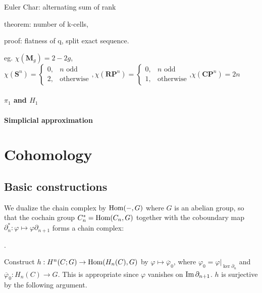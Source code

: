 \documentclass[11pt]{article}
\theoremstyle{definition}
\theoremstyle{plain}
\newcommand{\im}{\textup{Im}\,}
\newcommand{\Hom}{\textup{Hom}}
\newcommand{\1}{\mathbf{1}}
\begin{document}
Euler Char: alternating sum of rank

theorem: number of k-cells,

proof: flatness of q, split exact sequence.

eg. $\chi(\mathbf{M}_g)=2-2g$, $\chi(\mathbf{S}^n)=\begin{cases}0,&n\textrm{ odd}\\2,&\textrm{otherwise}
\end{cases},\chi(\mathbf{RP}^n)=\begin{cases}0,&n\textrm{ odd}\\1,&\textrm{otherwise}
\end{cases}$,$\chi(\mathbf{CP}^n)=2n$

\paragraph{$\pi_1$ and $H_1$}

\paragraph{Simplicial approximation}

\newpage
\section{Cohomology}

\subsection{Basic constructions}

We dualize the chain complex by $\Hom(-,G)$ where $G$ is an abelian group, so that the cochain group $C^\ast_n=\Hom(C_n,G)$ together with the coboundary map $\partial_n^\ast:\varphi\mapsto\varphi\partial_{n+1}$ forms a chain complex:
\begin{center}.\end{center}

Construct $h:H^n(C;G)\to\Hom(H_n(C),G)$ by $\varphi\mapsto\overline{\varphi}_0$, where $\varphi_0=\varphi|_{\ker\partial_n}$ and $\overline{\varphi}_0:H_n(C)\to G$. This is appropriate since $\varphi$ vanishes on $\im\partial_{n+1}$. $h$ is surjective by the following argument.\medbreak
\end{document}

